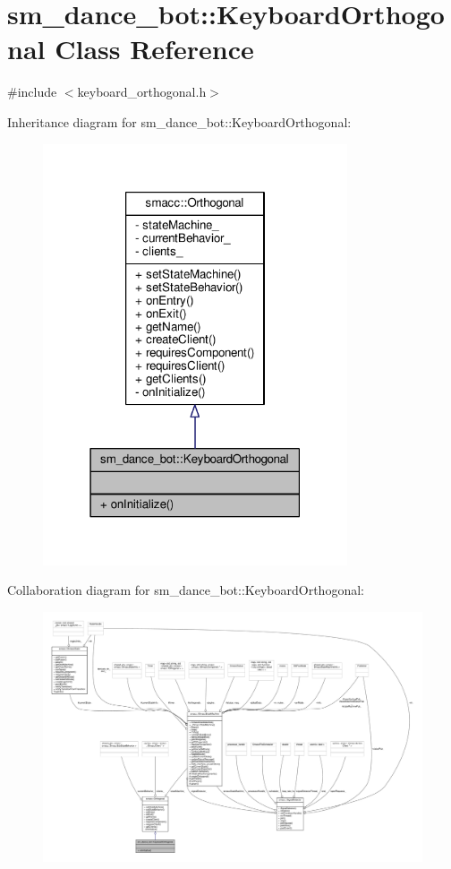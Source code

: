 \hypertarget{classsm__dance__bot_1_1KeyboardOrthogonal}{}\section{sm\+\_\+dance\+\_\+bot\+:\+:Keyboard\+Orthogonal Class Reference}
\label{classsm__dance__bot_1_1KeyboardOrthogonal}


{\ttfamily \#include $<$keyboard\+\_\+orthogonal.\+h$>$}



Inheritance diagram for sm\+\_\+dance\+\_\+bot\+:\+:Keyboard\+Orthogonal\+:
\nopagebreak
\begin{figure}[H]
\begin{center}
\leavevmode
\includegraphics[width=255pt]{classsm__dance__bot_1_1KeyboardOrthogonal__inherit__graph}
\end{center}
\end{figure}


Collaboration diagram for sm\+\_\+dance\+\_\+bot\+:\+:Keyboard\+Orthogonal\+:
\nopagebreak
\begin{figure}[H]
\begin{center}
\leavevmode
\includegraphics[width=350pt]{classsm__dance__bot_1_1KeyboardOrthogonal__coll__graph}
\end{center}
\end{figure}
